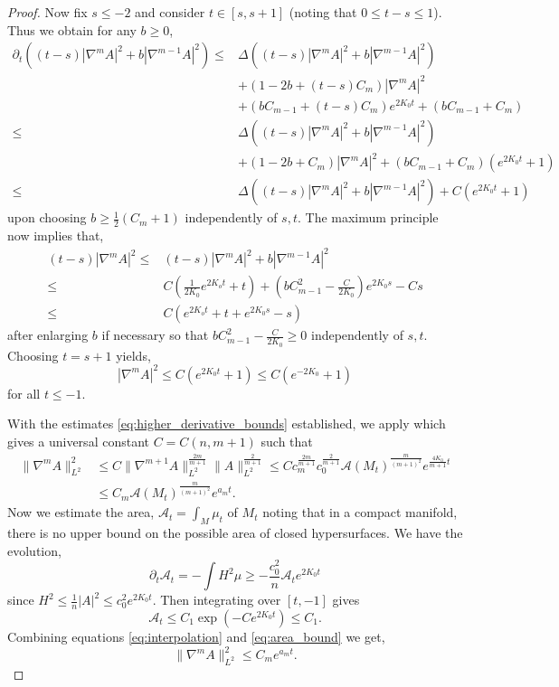 \documentclass{amsart}
\begin{document}
\begin{proof}
Now fix \(s \leq -2\) and consider \(t \in [s, s+1]\) (noting that \(0 \leq t-s \leq 1\)). Thus we obtain for any \(b \geq 0\),
\begin{align*}
\partial_t ((t-s)|\nabla^m A|^2 + b|\nabla^{m-1} A|^2) \leq& \Delta((t-s)|\nabla^m A|^2 + b|\nabla^{m-1}A|^2) \\
&+ (1 - 2b + (t-s)C_m) |\nabla^m A|^2 \\
& + (bC_{m-1} + (t-s)C_m) e^{2K_0 t} + (bC_{m-1} + C_m) \\
\leq& \Delta((t-s)|\nabla^m A|^2 + b|\nabla^{m-1}A|^2) \\
&+ (1 - 2b + C_m) |\nabla^m A|^2 + (bC_{m-1} + C_m) (e^{2K_0 t} + 1) \\
\leq& \Delta((t-s)|\nabla^m A|^2 + b|\nabla^{m-1}A|^2) + C (e^{2K_0 t} + 1)
\end{align*}
upon choosing \(b \geq \tfrac{1}{2}(C_m + 1)\) independently of \(s, t\). The maximum principle now implies that,
\[
\begin{split}
(t-s) |\nabla^m A|^2 \leq& (t-s)|\nabla^m A|^2 + b|\nabla^{m-1} A|^2 \\
\leq& C\left(\frac{1}{2K_0} e^{2K_o t} + t\right) + \left(bC_{m-1}^2 - \frac{C}{2K_0}\right)e^{2K_0 s} - Cs \\
\leq& C(e^{2K_o t} + t + e^{2K_0 s} - s)
\end{split}
\]
after enlarging \(b\) if necessary so that \(bC_{m-1}^2 - \tfrac{C}{2K_0} \geq 0\) independently of \(s,t\). Choosing \(t = s + 1\) yields,
\[
|\nabla^m A|^2 \leq C (e^{2K_0t} + 1) \leq C(e^{-2K_0} + 1)
\]
for all \(t \leq -1\).

With the estimates \eqref{eq:higher_derivative_bounds} established, we apply \cite[12.7 Corollary]{Hamilton:/1982} which gives a universal constant \(C = C(n, m+1)\) such that
\begin{equation}
\label{eq:interpolation}
\begin{split}
\|\nabla^m A\|_{L^2}^2 &\leq C \|\nabla^{m+1} A\|_{L^2}^{\tfrac{2m}{m+1}} \|A\|_{L^2}^{\tfrac{2}{m+1}} \leq C c_m^{\tfrac{2m}{m+1}} c_0^{\tfrac{2}{m+1}} \mathcal{A}(M_t)^{\tfrac{m}{(m+1)^2}} e^{\tfrac{4K_0}{m+1}t} \\
&\leq C_m \mathcal{A}(M_t)^{\tfrac{m}{(m+1)^2}} e^{a_m t}.
\end{split}
\end{equation}
Now we estimate the area, \(\mathcal{A}_t = \int_M \mu_t\) of \(M_t\) noting that in a compact manifold, there is no upper bound on the possible area of closed hypersurfaces. We have the evolution,
\[
\partial_t \mathcal{A}_t = -\int H^2 \mu \geq -\frac{c_0^2}{n} \mathcal{A}_t e^{2K_0 t}
\]
since \(H^2 \leq \tfrac{1}{n} |A|^2 \leq c_0^2 e^{2K_0t}\). Then integrating over \([t, -1]\) gives
\begin{equation}
\label{eq:area_bound}
\mathcal{A}_t \leq C_1 \exp(-C e^{2K_0t}) \leq C_1.
\end{equation}
Combining equations \eqref{eq:interpolation} and \eqref{eq:area_bound} we get,
\[
\|\nabla^m A\|_{L^2}^2 \leq C_m e^{a_m t}.
\]
\end{proof}

\printbibliography
\end{document}
